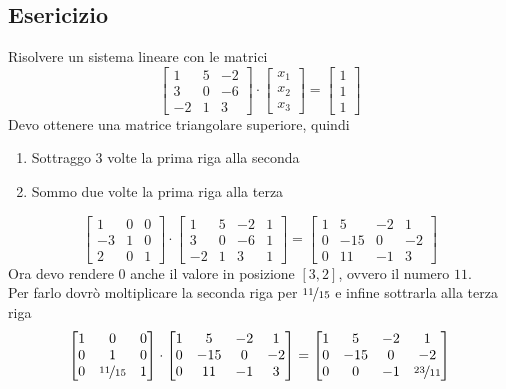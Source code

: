 \documentclass[italian]{article}
\begin{document}
\subsection{Esericizio}
Risolvere un sistema lineare con le matrici
\[
	\begin{bmatrix}
		1 & 5 & -2 \\
		3 & 0 & -6 \\
		-2 & 1 & 3
	\end{bmatrix}
	\cdot
	\begin{bmatrix}
		x_1 \\ x_2 \\ x_3
	\end{bmatrix}
	=
	\begin{bmatrix}
		1 \\ 1 \\ 1
	\end{bmatrix}
\]
Devo ottenere una matrice triangolare superiore, quindi
\begin{enumerate}[label=\alph*.]
	\item Sottraggo 3 volte la prima riga alla seconda
	\item Sommo due volte la prima riga alla terza
\end{enumerate}
\[
	\begin{bmatrix}
		1 & 0 & 0 \\
		-3 & 1 & 0 \\
		2 & 0 & 1
	\end{bmatrix}
	\cdot
	\begin{bmatrix}
		1 & 5 & -2 & 1\\
		3 & 0 & -6 & 1\\
		-2 & 1 & 3 & 1 
	\end{bmatrix}
	=
	\begin{bmatrix}
		1 & 5 & -2 & 1\\
		0 & -15 & 0 & -2\\
		0 & 11 & -1 & 3 
	\end{bmatrix}
\]
Ora devo rendere $0$ anche il valore in posizione $[3,2]$, ovvero il numero $11$. \\Per farlo dovrò moltiplicare la seconda riga per $\nicefrac{11}{15}$ e infine sottrarla alla terza riga
\[
	\begin{bmatrix}
		1 & 0 & 0 \\
		0 & 1 & 0 \\
		0 & \nicefrac{11}{15} & 1
	\end{bmatrix}
	\cdot
	\begin{bmatrix}
		1 & 5 & -2 & 1\\
		0 & -15 & 0 & -2\\
		0 & 11 & -1 & 3 
	\end{bmatrix}
	=
	\begin{bmatrix}
		1 & 5 & -2 & 1 \\
		0 & -15 & 0 & -2 \\
		0 & 0 & -1 & \nicefrac{23}{11}
	\end{bmatrix}
\]
\end{document}

